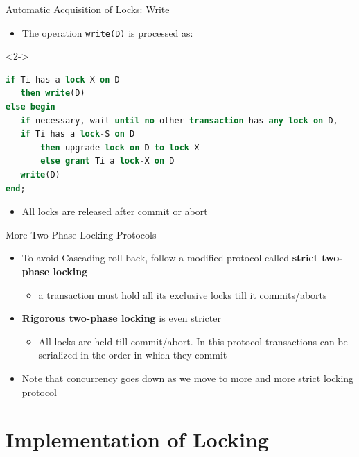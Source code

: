 \documentclass[aspectratio=169, xcolor=dvipsnames]{beamer}
\begin{document}
\begin{frame}[fragile]{Automatic Acquisition of Locks: Write}
    \begin{itemize}[<+->]
        \item The operation \texttt{write(D)} is processed as:
    \end{itemize}
    \begin{onlyenv}<2->
        \begin{lstlisting}[language=SQL]
if Ti has a lock-X on D
   then write(D)
else begin 
   if necessary, wait until no other transaction has any lock on D, 
   if Ti has a lock-S on D
       then upgrade lock on D to lock-X
       else grant Ti a lock-X on D
   write(D)
end;
        \end{lstlisting}
    \end{onlyenv}
    \begin{itemize}[<+->]
        \item<3-> All locks are released after commit or abort
    \end{itemize}
\end{frame}

\begin{frame}{More Two Phase Locking Protocols}
    \begin{itemize}[<+->]
        \item To avoid Cascading roll-back, follow a modified protocol called \textbf{strict two-phase locking}
        \begin{itemize}
            \item[$\triangleright$] a transaction must hold all its exclusive locks till it commits/aborts
        \end{itemize}
        \item \textbf{Rigorous two-phase locking} is even stricter
        \begin{itemize}
            \item[$\triangleright$] All locks are held till commit/abort. In this protocol transactions can be serialized in the order in which they commit
        \end{itemize}
        \item Note that concurrency goes down as we move to more and more strict locking protocol
    \end{itemize}
\end{frame}

\section{Implementation of Locking}
\end{document}
